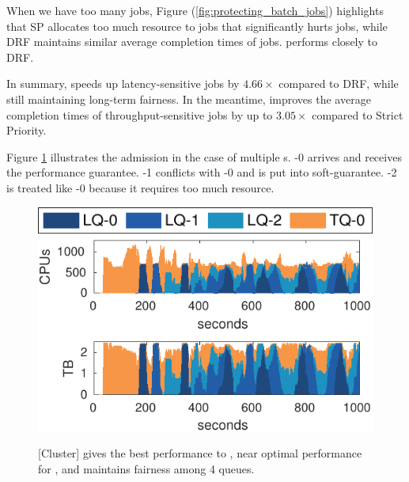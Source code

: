 When we have too many {\burstq} jobs, Figure (\ref{fig:protecting_batch_jobs}) highlights that SP allocates too much resource to \burstq jobs that significantly hurts \batchq jobs, while DRF maintains similar average completion times of \batchq jobs. \name performs closely to DRF.

In summary, \name speeds up latency-sensitive jobs by $4.66\times$ compared to DRF, while still maintaining long-term fairness. In the meantime, \name improves the average completion times of throughput-sensitive jobs by up to $3.05\times$ compared to Strict Priority.

Figure \ref{fig:admission_control_cluster} illustrates the admission in the case of multiple {\burstq}s. {\burstq}-0 arrives and receives the performance guarantee. {\burstq}-1 conflicts with {\burstq}-0 and is put into soft-guarantee. {\burstq}-2 is treated like {\batchq}-0 because it requires too much resource.

\begin{figure}[!h]
	\centering
	\includegraphics[width=0.6\linewidth]{fig/b1i3_res_usage_legend} 	
	\includegraphics[width=0.8\linewidth]{fig/res_usage_b1i3_BPF_BB} \label{fig:admission_speedfair_cluster}
	\vspace{-0.15in}		
	\caption{[Cluster] \name gives the best performance to , near optimal performance for , and maintains fairness among 4 queues.}
	\label{fig:admission_control_cluster}
\end{figure}

\label{EndOfPaper}